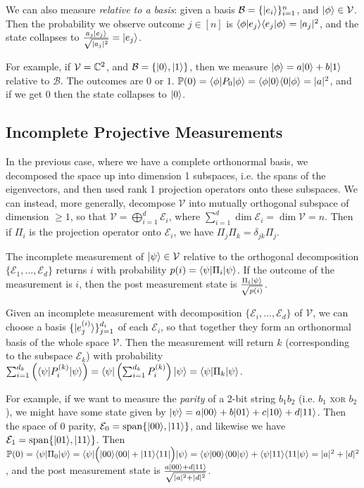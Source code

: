 \documentclass[10pt,a4paper]{article}
\begin{document}
We can also measure \emph{relative to a basis}: given a basis $\mathcal{B} = \{|e_i\rangle\}_{i=1}^n$, and $|\phi\rangle \in \mathcal{V}$. Then the probability we observe outcome $j \in [n]$ is $\langle \phi | e_j \rangle\langle e_j | \phi \rangle = |a_j|^2$, and the state collapses to $\frac{a_j |e_j\rangle}{\sqrt{|a_j|^2}} = |e_j\rangle$.

For example, if $\mathcal{V} = \mathbb{C}^2$, and $\mathcal{B} = \{|0\rangle,|1\rangle\}$, then we measure $|\phi\rangle = a|0\rangle+b|1\rangle$ relative to $\mathcal{B}$. The outcomes are $0$ or $1$. $\mathbb{P}(0) = \langle \phi|P_0|\phi\rangle = \langle \phi | 0 \rangle\langle 0 | \phi \rangle = |a|^2$, and if we get $0$ then the state collapses to $|0\rangle$.

\subsection{Incomplete Projective Measurements}
In the previous case, where we have a complete orthonormal basis, we decomposed the space up into dimension 1 subspaces, i.e. the spans of the eigenvectors, and then used rank 1 projection operators onto these subspaces. We can instead, more generally, decompose $\mathcal{V}$ into mutually orthogonal subspace of dimension $\geq 1$, so that $\mathcal{V} = \bigoplus_{i=1}^d \mathcal{E}_i$, where $\sum_{i=1}^d \dim \mathcal{E}_i = \dim\mathcal{V} = n$. Then if $\Pi_i$ is the projection operator onto $\mathcal{E}_i$, we have $\Pi_j\Pi_k = \delta_{jk}\Pi_j$.

The incomplete measurement of $|\psi\rangle \in \mathcal{V}$ relative to the orthogonal decomposition $\{\mathcal{E}_1, \ldots, \mathcal{E}_d\}$ returns $i$ with probability $p(i) = \langle \psi|\Pi_i|\psi\rangle$. If the outcome of the measurement is $i$, then the post measurement state is $\frac{\Pi_i |\psi\rangle}{\sqrt{p(i)}}$.

Given an incomplete measurement with decomposition $\{\mathcal{E}_i,\ldots, \mathcal{E}_d\}$ of $\mathcal{V}$, we can choose a basis $\{|e^{(i)}_j\rangle\}_{j=1}^{d_i}$ of each $\mathcal{E}_i$, so that together  they form an orthonormal basis of the whole space $\mathcal{V}$. Then the measurement will return $k$ (corresponding to the subspace $\mathcal{E}_k$) with probability $\sum_{i=1}^{d_k} \left(\langle \psi| P_i^{(k)} |\psi\rangle\right) = \langle \psi| \left(\sum_{i=1}^{d_k} P_i^{(k)}\right) |\psi\rangle = \langle \psi| \Pi_{k} |\psi\rangle$.

For example, if we want to measure the \emph{parity} of a 2-bit string $b_1b_2$ (i.e. $b_1$ \textsc{xor} $b_2$), we might have some state given by $|\psi\rangle = a|00\rangle + b|01\rangle + c|10\rangle + d|11\rangle$. Then the space of 0 parity, $\mathcal{E}_0 = \operatorname{span}\{|00\rangle,|11\rangle\}$, and likewise we have $\mathcal{E}_1 = \operatorname{span}\{|01\rangle,|11\rangle\}$. Then $\mathbb{P}(0) = \langle \psi|\Pi_0 |\psi\rangle = \langle \psi|\Big(|00\rangle\langle 00|+|11\rangle\langle 11|\Big)|\psi\rangle = \langle \psi | 00 \rangle\langle 00 | \psi \rangle +  \langle \psi | 11 \rangle\langle 11 | \psi \rangle = |a|^2 + |d|^2$, and the post measurement state is $\frac{a|00\rangle + d|11\rangle}{\sqrt{|a|^2 + |d|^2}}$.
\end{document}

